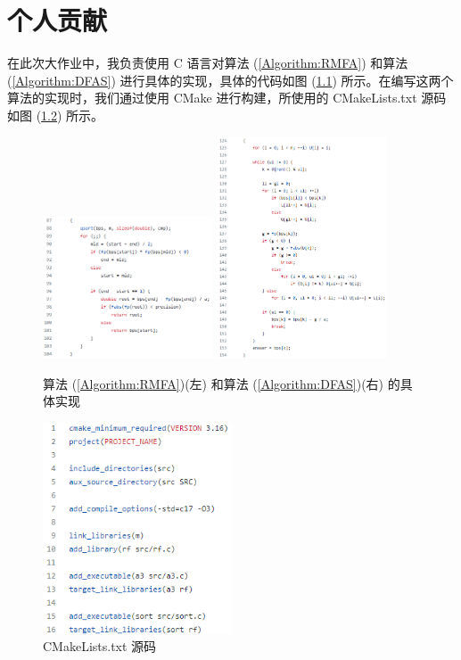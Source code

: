 
\chapter{个人贡献}

在此次大作业中，我负责使用 C 语言对算法 (\ref{Algorithm:RMFA}) 和算法 (\ref{Algorithm:DFAS}) 进行具体的实现，具体的代码如图 (\ref{Implement}) 所示。在编写这两个算法的实现时，我们通过使用 CMake 进行构建，所使用的 CMakeLists.txt 源码如图 (\ref{CMakeLists}) 所示。

\begin{figure}[htb]
    \centering
    \includegraphics[width=0.45\textwidth]{figures/c@rf_sort().png}
    \qquad
    \includegraphics[width=0.45\textwidth]{figures/c@rf_a3().png}
    \caption{算法 (\ref{Algorithm:RMFA})(左) 和算法 (\ref{Algorithm:DFAS})(右) 的具体实现}
    \label{Implement}
\end{figure}

\begin{figure}[htb]
    \centering
    \includegraphics[width=0.5\textwidth]{figures/c@CMakeLists.png}
    \caption{CMakeLists.txt 源码}
    \label{CMakeLists}
\end{figure}

